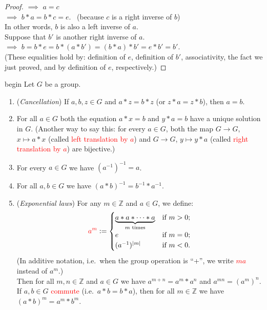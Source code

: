 \documentclass[
  12pt,
  a4paper,
  twoside]{article}
\theoremstyle{plain}
\theoremstyle{definition}
\begin{document}
\begin{proof}
\(\implies\) \(a=c\)\\
\(\implies\) \(b*a = b*c = e\). \hfill~{(because \(c\) is a right inverse of \(b\))}\\
In other words, \(b\) is also a left inverse of \(a\).\\
Suppose that \(b'\) is another right inverse of \(a\).\\
\(\implies\) \(b=b*e=b*(a*b')=(b*a)*b' = e*b' = b'\).\\
(These equalities hold by: definition of \(e\), definition of \(b'\), associativity, the fact we just proved, and by definition of \(e\), respectively.)
\end{proof}

\csname begin\label{cnj:prop-more-group-props}
Let \(G\) be a group.

\begin{enumerate}
\def\labelenumi{(\alph{enumi})}
\item
  (\emph{Cancellation}) If \(a,b,z\in G\) and \(a*z=b*z\) (or \(z*a=z*b\)), then \(a=b\).
\item
  For all \(a\in G\) both the equation \(a*x=b\) and \(y*a=b\) have a unique solution in \(G\). (Another way to say this: for every \(a\in G\), both the map \(G\to G\), \(x\mapsto a*x\) (called \textcolor{red}{left translation by $a$}) and \(G\to G\), \(y\mapsto y*a\) (called \textcolor{red}{right translation by $a$}) are bijective.)
\item
  For every \(a\in G\) we have \((a^{-1})^{-1}=a\).
\item
  For all \(a,b\in G\) we have \((a*b)^{-1}=b^{-1}*a^{-1}\).
\item
  (\emph{Exponential laws}) For any \(m\in \mathbb{Z}\) and \(a\in G\), we define:
  \[
  {\color{red}{a^m}} :=
  \begin{cases}
  \underbrace{a*a*\cdots*a}_{m\text{ times}} & \text{if }m>0;\\
  e & \text{if }m=0;\\
  (a^{-1})^{|m|} & \text{if }m<0.
  \end{cases}
  \]
  (In additive notation, i.e.~when the group operation is ``+'', we write \textcolor{red}{$ma$} instead of \(a^m\).)\\
  Then for all \(m,n\in\mathbb{Z}\) and \(a\in G\) we have \(a^{m+n}=a^m * a^n\) and \(a^{mn}=(a^m)^n\).\\
  If \(a,b\in G\) \textcolor{red}{commute} (i.e.~\(a*b=b*a\)), then for all \(m\in\mathbb{Z}\) we have \((a*b)^m = a^m*b^m\).
\end{enumerate}
\end{document}
